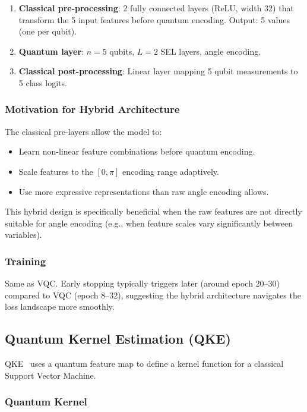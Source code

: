\documentclass[journal]{IEEEtran}
\begin{document}
\begin{enumerate}
  \item \textbf{Classical pre-processing}: 2 fully connected layers (ReLU,
        width 32) that transform the 5 input features before quantum encoding.
        Output: 5 values (one per qubit).
  \item \textbf{Quantum layer}: $n=5$ qubits, $L=2$ SEL layers, angle encoding.
  \item \textbf{Classical post-processing}: Linear layer mapping 5 qubit
        measurements to 5 class logits.
\end{enumerate}

\subsubsection{Motivation for Hybrid Architecture}

The classical pre-layers allow the model to:
\begin{itemize}
  \item Learn non-linear feature combinations before quantum encoding.
  \item Scale features to the $[0, \pi]$ encoding range adaptively.
  \item Use more expressive representations than raw angle encoding allows.
\end{itemize}
This hybrid design is specifically beneficial when the raw features are not
directly suitable for angle encoding (e.g., when feature scales vary
significantly between variables).

\subsubsection{Training}

Same as VQC. Early stopping typically triggers later (around epoch 20--30)
compared to VQC (epoch 8--32), suggesting the hybrid architecture navigates
the loss landscape more smoothly.

\subsection{Quantum Kernel Estimation (QKE)}
\label{sec:qke}

QKE~\cite{havlicek2019supervised} uses a quantum feature map to define a kernel
function for a classical Support Vector Machine.

\subsubsection{Quantum Kernel}
\end{document}
